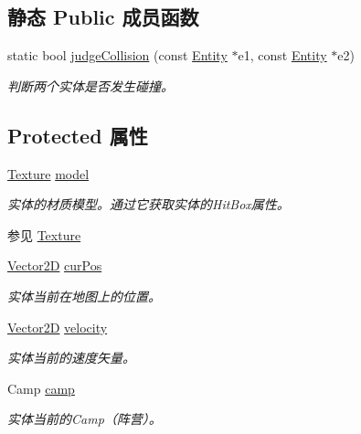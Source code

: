 \subsection*{静态 Public 成员函数}
\begin{DoxyCompactItemize}
\item 
static bool \hyperlink{class_entity_afeab7f54f15446e13fbf218eccb8be53}{judge\+Collision} (const \hyperlink{class_entity}{Entity} $\ast$e1, const \hyperlink{class_entity}{Entity} $\ast$e2)
\begin{DoxyCompactList}\small\item\em 判断两个实体是否发生碰撞。 \end{DoxyCompactList}\end{DoxyCompactItemize}
\subsection*{Protected 属性}
\begin{DoxyCompactItemize}
\item 
\hyperlink{struct_texture}{Texture} \hyperlink{class_entity_a22ccba8fb86e5b4e10b2c33b6f56d238}{model}
\begin{DoxyCompactList}\small\item\em 实体的材质模型。通过它获取实体的\+Hit\+Box属性。\begin{DoxySeeAlso}{参见}
\hyperlink{struct_texture}{Texture}


\end{DoxySeeAlso}
\end{DoxyCompactList}\item 
\hyperlink{structbasic__vector2_d}{Vector2D} \hyperlink{class_entity_a5031aa6b058f2231daad16b35e3d536d}{cur\+Pos}
\begin{DoxyCompactList}\small\item\em 实体当前在地图上的位置。 \end{DoxyCompactList}\item 
\hyperlink{structbasic__vector2_d}{Vector2D} \hyperlink{class_entity_a386d25b56772b8913eb3e5adc636f6e0}{velocity}
\begin{DoxyCompactList}\small\item\em 实体当前的速度矢量。 \end{DoxyCompactList}\item 
Camp \hyperlink{class_entity_a5326accd49d3817310ec90692b9da3df}{camp}
\begin{DoxyCompactList}\small\item\em 实体当前的Camp（阵营）。 \end{DoxyCompactList}\end{DoxyCompactItemize}



